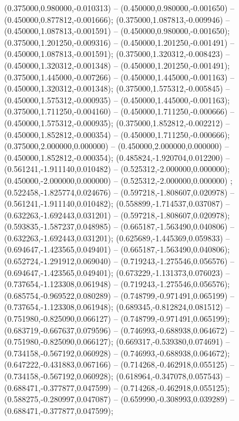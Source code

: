  (0.375000,0.980000,-0.010313) -- (0.450000,0.980000,-0.001650) -- (0.450000,0.877812,-0.001666);
 (0.375000,1.087813,-0.009946) -- (0.450000,1.087813,-0.001591) -- (0.450000,0.980000,-0.001650);
 (0.375000,1.201250,-0.009316) -- (0.450000,1.201250,-0.001491) -- (0.450000,1.087813,-0.001591);
 (0.375000,1.320312,-0.008423) -- (0.450000,1.320312,-0.001348) -- (0.450000,1.201250,-0.001491);
 (0.375000,1.445000,-0.007266) -- (0.450000,1.445000,-0.001163) -- (0.450000,1.320312,-0.001348);
 (0.375000,1.575312,-0.005845) -- (0.450000,1.575312,-0.000935) -- (0.450000,1.445000,-0.001163);
 (0.375000,1.711250,-0.004160) -- (0.450000,1.711250,-0.000666) -- (0.450000,1.575312,-0.000935);
 (0.375000,1.852812,-0.002212) -- (0.450000,1.852812,-0.000354) -- (0.450000,1.711250,-0.000666);
 (0.375000,2.000000,0.000000) -- (0.450000,2.000000,0.000000) -- (0.450000,1.852812,-0.000354);
 (0.485824,-1.920704,0.012200) -- (0.561241,-1.911140,0.010482) -- (0.525312,-2.000000,0.000000);
 (0.450000,-2.000000,0.000000) -- (0.525312,-2.000000,0.000000) ;
 (0.522458,-1.825774,0.024676) -- (0.597218,-1.808607,0.020978) -- (0.561241,-1.911140,0.010482);
 (0.558899,-1.714537,0.037087) -- (0.632263,-1.692443,0.031201) -- (0.597218,-1.808607,0.020978);
 (0.593835,-1.587237,0.048985) -- (0.665187,-1.563490,0.040806) -- (0.632263,-1.692443,0.031201);
 (0.625689,-1.445369,0.059833) -- (0.694647,-1.423565,0.049401) -- (0.665187,-1.563490,0.040806);
 (0.652724,-1.291912,0.069040) -- (0.719243,-1.275546,0.056576) -- (0.694647,-1.423565,0.049401);
 (0.673229,-1.131373,0.076023) -- (0.737654,-1.123308,0.061948) -- (0.719243,-1.275546,0.056576);
 (0.685754,-0.969522,0.080289) -- (0.748799,-0.971491,0.065199) -- (0.737654,-1.123308,0.061948);
 (0.689345,-0.812824,0.081512) -- (0.751980,-0.825090,0.066127) -- (0.748799,-0.971491,0.065199);
 (0.683719,-0.667637,0.079596) -- (0.746993,-0.688938,0.064672) -- (0.751980,-0.825090,0.066127);
 (0.669317,-0.539380,0.074691) -- (0.734158,-0.567192,0.060928) -- (0.746993,-0.688938,0.064672);
 (0.647222,-0.431883,0.067166) -- (0.714268,-0.462918,0.055125) -- (0.734158,-0.567192,0.060928);
 (0.618964,-0.347078,0.057543) -- (0.688471,-0.377877,0.047599) -- (0.714268,-0.462918,0.055125);
 (0.588275,-0.280997,0.047087) -- (0.659990,-0.308993,0.039289) -- (0.688471,-0.377877,0.047599);
